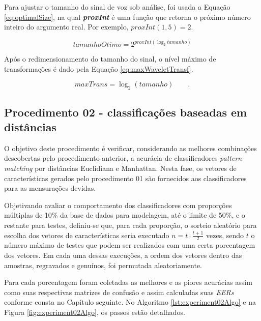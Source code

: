 		\par Para ajustar o tamanho do sinal de voz sob análise, foi usada a Equação \ref{eq:optimalSize}, na qual \textit{\textbf{proxInt}} é uma função que retorna o próximo número inteiro do argumento real. Por exemplo, $proxInt(1,5) = 2$.

		\begin{equation}
					tamanhoOtimo=2^{proxInt(\log_{2}tamanho)}
					\label{eq:optimalSize}
		\end{equation} 
		
		\par Após o redimensionamento do tamanho do sinal, o nível máximo de transformações é dado pela Equação \ref{eq:maxWaveletTransf}. 
				
		\begin{equation}
					maxTrans=\log_{2}(tamanho) \qquad.
					\label{eq:maxWaveletTransf}
		\end{equation}
		
		\subsection{Procedimento 02 - classificações baseadas em distâncias}
		\label{chap:propApproach:sec:Experimento02}
		\par O objetivo deste procedimento é verificar, considerando as melhores combinações descobertas pelo procedimento anterior, a acurácia de classificadores \textit{pattern-matching} por distâncias Euclidiana e Manhattan. Nesta fase, os vetores de características gerados pelo procedimento 01 são fornecidos aos classificadores para as mensurações devidas.
				
		\par Objetivando avaliar o comportamento dos classificadores com proporções múltiplas de 10\% da base de dados para modelagem, até o limite de 50\%, e o restante para testes, definiu-se que, para cada proporção, o sorteio aleatório para escolha dos vetores de características seria executado $n=t \cdot \frac{t+1}{2}$ vezes, sendo $t$ o número máximo de testes que podem ser realizados com uma certa porcentagem dos vetores. Em cada uma dessas execuções, a ordem dos vetores dentro das amostras, regravados e genuínos, foi permutada aleatoriamente.
				
		\par Para cada porcentagem foram coletadas as melhores e as piores acurácias assim como suas respectivas matrizes de confusão e assim calculadas suas \textit{EERs} conforme consta no Capítulo seguinte. No Algoritmo \ref{lst:experiment02Algo} e na Figura \ref{fig:experiment02Algo}, os passos estão detalhados.
		

